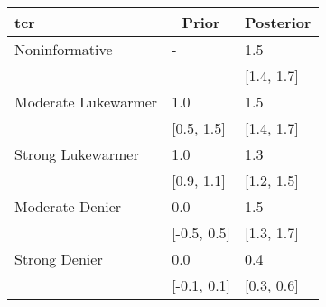 \begin{table}[!tbp]
\begin{center}
\begin{tabular}{lll}
\hline\hline
\multicolumn{1}{l}{tcr}&\multicolumn{1}{c}{Prior}&\multicolumn{1}{c}{Posterior}\tabularnewline
\hline
Noninformative&-&1.5\tabularnewline
&&[1.4, 1.7]\tabularnewline
Moderate Lukewarmer&1.0&1.5\tabularnewline
&[0.5, 1.5]&[1.4, 1.7]\tabularnewline
Strong Lukewarmer&1.0&1.3\tabularnewline
&[0.9, 1.1]&[1.2, 1.5]\tabularnewline
Moderate Denier&0.0&1.5\tabularnewline
&[-0.5, 0.5]&[1.3, 1.7]\tabularnewline
Strong Denier&0.0&0.4\tabularnewline
&[-0.1, 0.1]&[0.3, 0.6]\tabularnewline
\hline
\end{tabular}\end{center}

\end{table}
